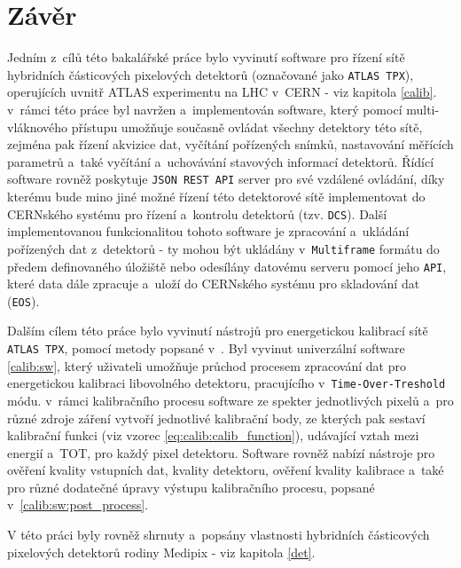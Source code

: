 

\chapter{Závěr}
Jedním z~cílů této bakalářské práce bylo vyvinutí software pro řízení sítě hybridních částicových pixelových detektorů (označované jako \texttt{ATLAS TPX}), operujících uvnitř ATLAS experimentu na LHC v~CERN - viz kapitola \ref{calib}. v~rámci této práce byl navržen a~implementován software, který pomocí multi-vláknového přístupu umožňuje současně ovládat všechny detektory této sítě, zejména pak řízení akvizice dat, vyčítání pořízených snímků, nastavování měřících parametrů a~také vyčítání a~uchovávání stavových informací detektorů. Řídící software rovněž poskytuje \texttt{JSON REST API} server pro své vzdálené ovládání, díky kterému bude mino jiné možné řízení této detektorové sítě implementovat do CERNského systému pro řízení a~kontrolu detektorů (tzv. \texttt{DCS}). Další implementovanou funkcionalitou tohoto software je zpracování a~ukládání pořízených dat z~detektorů - ty mohou být ukládány v~\texttt{Multiframe} formátu do předem definovaného úložiště nebo odesílány datovému serveru pomocí jeho \texttt{API}, které data dále zpracuje a~uloží do CERNského systému pro skladování dat (\texttt{EOS}).

Dalším cílem této práce bylo vyvinutí nástrojů pro energetickou kalibrací sítě \texttt{ATLAS TPX}, pomocí metody popsané v~\cite{Jakubek2011S262}. Byl vyvinut univerzální software \ref{calib:sw}, který uživateli umožňuje průchod procesem zpracování dat pro energetickou kalibraci libovolného detektoru, pracujícího v~\texttt{Time-Over-Treshold} módu. v~rámci kalibračního procesu software ze spekter jednotlivých pixelů a~pro různé zdroje záření vytvoří jednotlivé kalibrační body, ze kterých pak sestaví kalibrační funkci (viz vzorec \ref{eq:calib:calib_function}), udávající vztah mezi energií a~TOT, pro každý pixel detektoru. Software rovněž nabízí nástroje pro ověření kvality vstupních dat, kvality detektoru, ověření kvality kalibrace a~také pro různé dodatečné úpravy výstupu kalibračního procesu, popsané v~\ref{calib:sw:post_process}.

V této práci byly rovněž shrnuty a~popsány vlastnosti hybridních částicových pixelových detektorů rodiny Medipix - viz kapitola \ref{det}.